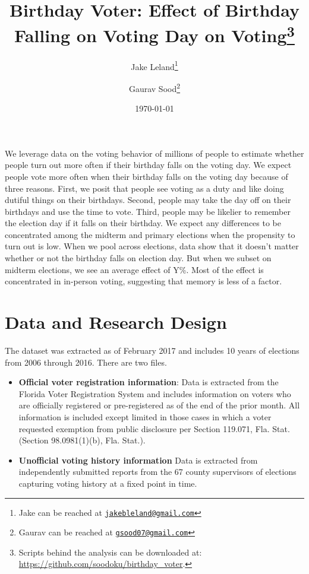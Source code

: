 \documentclass[12pt, letterpaper]{article}
\title{\Large{Birthday Voter: Effect of Birthday Falling on Voting Day on Voting}\footnote{Scripts behind the analysis can be downloaded at: \url{https://github.com/soodoku/birthday_voter}.}}
\author{Jake Leland\thanks{Jake can be reached at \href{mailto:jake.leland@utexas.edu}{\footnotesize{\texttt{jakebleland@gmail.com}}}}
\and Gaurav Sood\thanks{Gaurav can be reached at \href{mailto:gsood07@gmail.com}{\footnotesize{\texttt{gsood07@gmail.com}}}}}
\date{\vspace{.5cm}\normalsize{\today}}
\begin{document}
\maketitle

\begin{abstract}

\end{abstract}

\clearpage
\doublespacing
We leverage data on the voting behavior of millions of people to estimate whether people turn out more often if their birthday falls on the voting day. We expect people vote more often when their birthday falls on the voting day because of three reasons. First, we posit that people see voting as a duty and like doing dutiful things on their birthdays. Second, people may take the day off on their birthdays and use the time to vote. Third, people may be likelier to remember the election day if it falls on their birthday. We expect any differences to be concentrated among the midterm and primary elections when the propensity to turn out is low. When we pool across elections, data show that it doesn't matter whether or not the birthday falls on election day. But when we subset on midterm elections, we see an average effect of Y\%. Most of the effect is concentrated in in-person voting, suggesting that memory is less of a factor.

\section{Data and Research Design}
The dataset was extracted as of February 2017 and includes 10 years of elections from 2006 through 2016. There are two files.

\begin{itemize}
	\item \textbf{Official voter registration information}: Data is extracted from the Florida Voter Registration System and includes information on voters who are officially registered or pre-registered as of the end of the prior month. All information is included except limited in those cases in which a voter requested exemption from public disclosure per Section 119.071, Fla. Stat.  (Section 98.0981(1)(b), Fla. Stat.).

	\item \textbf{Unofficial voting history information} Data is extracted from independently submitted reports from the 67 county supervisors of elections capturing voting history at a fixed point in time. 
\end{itemize}
\end{document}
